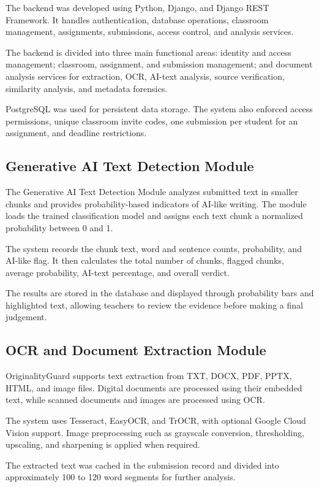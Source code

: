 \documentclass[12pt, a4paper]{report}
\numberwithin{equation}{chapter}
\begin{document}
The backend was developed using Python, Django, and Django REST Framework. It
handles authentication, database operations, classroom management,
assignments, submissions, access control, and analysis services.

The backend is divided into three main functional areas: identity and access
management; classroom, assignment, and submission management; and document
analysis services for extraction, OCR, AI-text analysis, source verification,
similarity analysis, and metadata forensics.

PostgreSQL was used for persistent data storage. The system also enforced
access permissions, unique classroom invite codes, one submission per
student for an assignment, and deadline restrictions.

\subsection{Generative AI Text Detection Module}

The Generative AI Text Detection Module analyzes submitted text in smaller
chunks and provides probability-based indicators of AI-like writing. The
module loads the trained classification model and assigns each text chunk a
normalized probability between 0 and 1.

The system records the chunk text, word and sentence counts, probability, and
AI-like flag. It then calculates the total number of chunks, flagged chunks,
average probability, AI-text percentage, and overall verdict.

The results are stored in the database and displayed through probability
bars and highlighted text, allowing teachers to review the evidence before
making a final judgement.
\subsection{OCR and Document Extraction Module}

OriginalityGuard supports text extraction from TXT, DOCX, PDF, PPTX, HTML,
and image files. Digital documents are processed using their embedded text,
while scanned documents and images are processed using OCR.

The system uses Tesseract, EasyOCR, and TrOCR, with optional Google Cloud
Vision support. Image preprocessing such as grayscale conversion,
thresholding, upscaling, and sharpening is applied when required.

The extracted text was cached in the submission record and divided into
approximately 100 to 120 word segments for further analysis.
\end{document}
